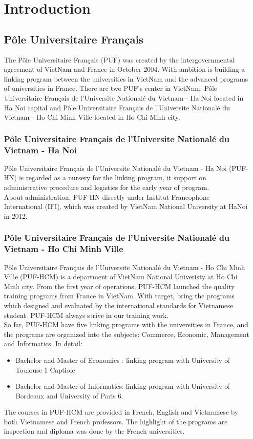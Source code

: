 \chapter{Introduction}
\section{P\^{o}le Universitaire Fran\c{c}ais}
The P\^{o}le Universitaire Fran\c{c}ais (PUF) was created by the intergovernmental agreement of VietNam and France in October 2004. With ambition is building a linking program between the universities in VietNam and the advanced programs of universities in France. There are two PUF's center in VietNam: P\^{o}le Universitaire Fran\c{c}ais de l'Universite National\'{e} du Vietnam - Ha Noi located in Ha Noi capital and P\^{o}le Universitaire Fran\c{c}ais de l'Universite National\'{e} du Vietnam - Ho Chi Minh Ville located in Ho Chi Minh city.
\subsection{P\^{o}le Universitaire Fran\c{c}ais de l'Universite National\'{e} du Vietnam - Ha Noi}
P\^{o}le Universitaire Fran\c{c}ais de l'Universite National\'{e} du Vietnam - Ha Noi (PUF-HN) is regarded as a nursery for the linking program, it support on administrative procedure and logistics for the early year of program.\\
About administration, PUF-HN directly under Institut Francophone International (IFI), which was created by VietNam National University at HaNoi in 2012.
\subsection{P\^{o}le Universitaire Fran\c{c}ais de l'Universite National\'{e} du Vietnam - Ho Chi Minh Ville}
P\^{o}le Universitaire Fran\c{c}ais de l'Universite National\'{e} du Vietnam - Ho Chi Minh Ville (PUF-HCM) is a department of VietNam National Univeristy at Ho Chi Minh city. From the first year of operations, PUF-HCM launched the quality training programs from France in VietNam. With target, bring the programs which designed and evaluated by the international standards for Vietnamese student. PUF-HCM always strive in our training work.\\
So far, PUF-HCM have five linking programs with the universities in France, and the programs are organized into the subjects: Commerce, Economic, Management and Informatics. In detail:
\begin{itemize}
\item Bachelor and Master of Economics : linking program with University of Toulouse 1 Captiole
\item Bachelor and Master of Informatics: linking program with University of Bordeaux and University of Paris 6.
\end{itemize}
The courses in PUF-HCM are provided in French, English and Vietnamese by both Vietnamese and French professors. The highlight of the programs are inspection and diploma was done by the French universities.
